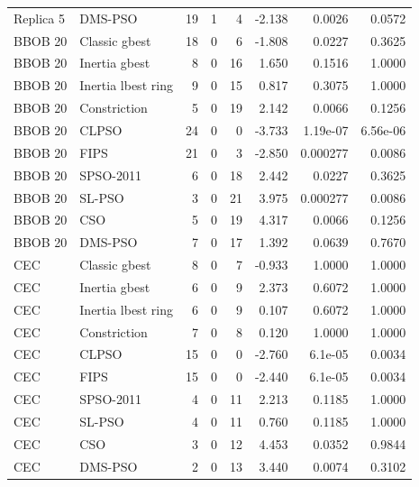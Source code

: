 \begin{longtable}{@{}llrrrrrr@{}}
Replica 5 & DMS-PSO & 19 & 1 & 4 & -2.138 & 0.0026 & 0.0572\\
BBOB 20 & Classic gbest & 18 & 0 & 6 & -1.808 & 0.0227 & 0.3625\\
BBOB 20 & Inertia gbest & 8 & 0 & 16 & 1.650 & 0.1516 & 1.0000\\
BBOB 20 & Inertia lbest ring & 9 & 0 & 15 & 0.817 & 0.3075 & 1.0000\\
BBOB 20 & Constriction & 5 & 0 & 19 & 2.142 & 0.0066 & 0.1256\\
BBOB 20 & CLPSO & 24 & 0 & 0 & -3.733 & 1.19e-07 & 6.56e-06\\
BBOB 20 & FIPS & 21 & 0 & 3 & -2.850 & 0.000277 & 0.0086\\
BBOB 20 & SPSO-2011 & 6 & 0 & 18 & 2.442 & 0.0227 & 0.3625\\
BBOB 20 & SL-PSO & 3 & 0 & 21 & 3.975 & 0.000277 & 0.0086\\
BBOB 20 & CSO & 5 & 0 & 19 & 4.317 & 0.0066 & 0.1256\\
BBOB 20 & DMS-PSO & 7 & 0 & 17 & 1.392 & 0.0639 & 0.7670\\
CEC & Classic gbest & 8 & 0 & 7 & -0.933 & 1.0000 & 1.0000\\
CEC & Inertia gbest & 6 & 0 & 9 & 2.373 & 0.6072 & 1.0000\\
CEC & Inertia lbest ring & 6 & 0 & 9 & 0.107 & 0.6072 & 1.0000\\
CEC & Constriction & 7 & 0 & 8 & 0.120 & 1.0000 & 1.0000\\
CEC & CLPSO & 15 & 0 & 0 & -2.760 & 6.1e-05 & 0.0034\\
CEC & FIPS & 15 & 0 & 0 & -2.440 & 6.1e-05 & 0.0034\\
CEC & SPSO-2011 & 4 & 0 & 11 & 2.213 & 0.1185 & 1.0000\\
CEC & SL-PSO & 4 & 0 & 11 & 0.760 & 0.1185 & 1.0000\\
CEC & CSO & 3 & 0 & 12 & 4.453 & 0.0352 & 0.9844\\
CEC & DMS-PSO & 2 & 0 & 13 & 3.440 & 0.0074 & 0.3102\\
\end{longtable}\normalsize
